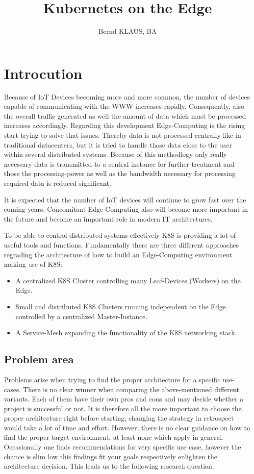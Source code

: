 \documentclass[MSC,Master,english]{twbook}%
\title{Kubernetes on the Edge}
\author{Bernd KLAUS, BA}
\begin{document}
\maketitle
\chapter{Introcution}
\label{chap:introduction}
Because of \ac{IoT} Devices becoming more and more common, the number of devices capable of communicating with the \ac{WWW} increases rapidly. Consequently, also the overall traffic generated as well the amount of data which must be processed increases accordingly. Regarding this development Edge-Computing is the rising start trying to solve that issues. Thereby data is not processed centrally like in traditional datacenters, but it is tried to handle those data close to the user within several distributed systems. Because of this methodlogy only really necessary data is transmitted to a central instance for further treatment and those the processing-power as well as the bandwidth necessary for processing required data is reduced significant. \par It is expected that the number of IoT devices will continue to grow fast\cite{SotE21} over the coming years. Concomitant Edge-Computing also will become more important in the future and become an important role in modern \ac{IT} architectures. \par To be able to control distributed systems effectively \ac{K8S} is providing a lot of useful tools and functions. Fundamentally there are three different approaches regrading the architecture of how to build an Edge-Computing environment making use of \ac{K8S}:

\begin{itemize}
    \label{item:architecture}
    \item A centralized \ac{K8S} Cluster controlling many Leaf-Devices (Workers) on the Edge.
    \item Small and distributed \ac{K8S} Clusters running independent on the Edge controlled by a
    centralized Master-Instance.
    \item A Service-Mesh expanding the functionality of the \ac{K8S} networking stack.
\end{itemize}

\section{Problem area}
Problems arise when trying to find the proper architecture for a specific use-cases. There is no clear winner when comparing the above-mentioned different variants. Each of them  have their own pros and cons and may decide whether a project is successful or not. It is therefore all the more important to choose the proper architecture right before starting, changing the strategy in retrospect would take a lot of time and effort. However, there is no clear guidance on how to find the proper target environment, at least none which apply in general. Occasionally one finds recommendations for very specific use case, however the chance is slim low this findings fit your goals respectively enlighten the architecture decision. This leads us to the following research question.
\end{document}
